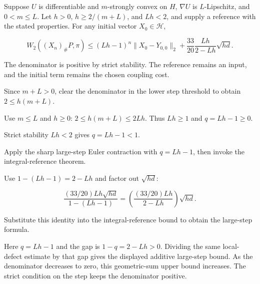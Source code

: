 \documentclass[11pt,a4paper]{article}
\begin{document}
Suppose \(U\) is differentiable and \(m\)-strongly convex on \(H\), \(\nabla U\) is \(L\)-Lipschitz, and \(0<m\le L\). Let \(h>0\), \(h\ge2/(m+L)\), and \(Lh<2\), and supply a reference with the stated properties. For any initial vector \(X_0\in\mathcal H\),

\[W_2((X_n)_\#P,\pi)\le(Lh-1)^n\|X_0-Y_{0,0}\|_2+\frac{33}{20}\frac{Lh}{2-Lh}\sqrt{hd}.\]

The denominator is positive by strict stability. The reference remains an input, and the initial term remains the chosen coupling cost.



Since \(m+L>0\), clear the denominator in the lower step threshold to obtain \(2\le h(m+L)\).



Use \(m\le L\) and \(h\ge0\): \(2\le h(m+L)\le2Lh\). Thus \(Lh\ge1\) and \(q=Lh-1\ge0\).



Strict stability \(Lh<2\) gives \(q=Lh-1<1\).



Apply the sharp large-step Euler contraction with \(q=Lh-1\), then invoke the integral-reference theorem.



Use \(1-(Lh-1)=2-Lh\) and factor out \(\sqrt{hd}\):

\[\frac{(33/20)Lh\sqrt{hd}}{1-(Lh-1)}=\left(\frac{(33/20)Lh}{2-Lh}\right)\sqrt{hd}.\]

Substitute this identity into the integral-reference bound to obtain the large-step formula.



Here \(q=Lh-1\) and the gap is \(1-q=2-Lh>0\). Dividing the same local-defect estimate by that gap gives the displayed additive large-step bound. As the denominator decreases to zero, this geometric-sum upper bound increases. The strict condition on the step keeps the denominator positive.
\end{document}
